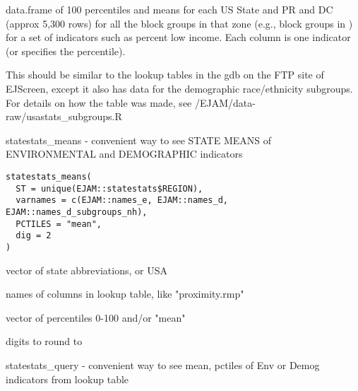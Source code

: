 \documentclass[a4paper]{book}
\begin{document}
%
\begin{Description}\relax
data.frame of 100 percentiles and means
for each US State and PR and DC (approx 5,300 rows)
for all the block groups in that zone (e.g., block groups in )
for a set of indicators such as percent low income.
Each column is one indicator (or specifies the percentile).

This should be similar to the lookup tables in the gdb on the FTP site of EJScreen,
except it also has data for the demographic race/ethnicity subgroups.
For details on how the table was made, see /EJAM/data-raw/usastats\_subgroups.R
\end{Description}
%
\begin{Description}\relax
statestats\_means - convenient way to see STATE MEANS of ENVIRONMENTAL and DEMOGRAPHIC indicators
\end{Description}
%
\begin{Usage}
\begin{verbatim}
statestats_means(
  ST = unique(EJAM::statestats$REGION),
  varnames = c(EJAM::names_e, EJAM::names_d, EJAM::names_d_subgroups_nh),
  PCTILES = "mean",
  dig = 2
)
\end{verbatim}
\end{Usage}
%
\begin{Arguments}
\begin{ldescription}
\item[\code{ST}] vector of state abbreviations, or USA

\item[\code{varnames}] names of columns in lookup table, like "proximity.rmp"

\item[\code{PCTILES}] vector of percentiles 0-100 and/or "mean"

\item[\code{dig}] digits to round to
\end{ldescription}
\end{Arguments}
%
\begin{Description}\relax
statestats\_query - convenient way to see mean, pctiles of Env or Demog indicators from lookup table
\end{Description}
\end{document}
